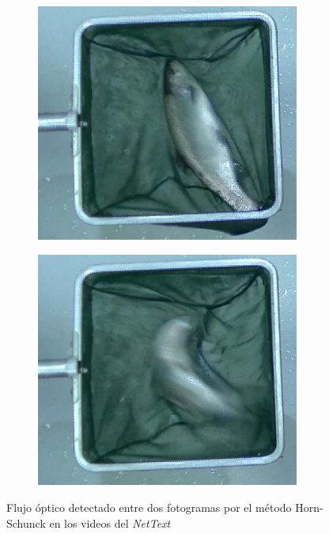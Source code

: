 \begin{figure}[H]
    \centering
    \begin{subfigure}[b]{0.49\textwidth}
        \centering
        \includegraphics[width=0.95\textwidth]{images/6/6.2.1/HSIzquierda1.png}
    \end{subfigure}
    \begin{subfigure}[b]{0.49\textwidth}
        \centering
        \includegraphics[width=0.95\textwidth]{images/6/6.2.1/HSIzquierda2.png}
    \end{subfigure}
    \caption{Flujo óptico detectado entre dos fotogramas por el método Horn-Schunck en los videos del \textit{NetText}}
    \label{fig:HSOpticalFlow}
\end{figure}

